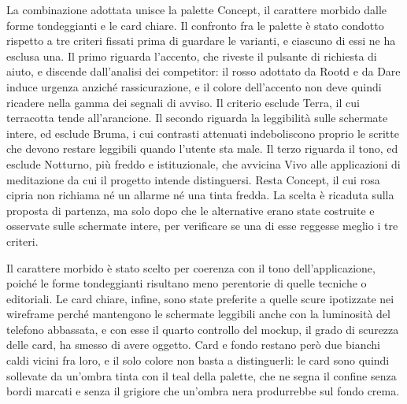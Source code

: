 La combinazione adottata unisce la palette Concept, il carattere morbido dalle forme tondeggianti e le card chiare.
Il confronto fra le palette è stato condotto rispetto a tre criteri fissati prima di guardare le varianti, e ciascuno di essi ne ha esclusa una.
Il primo riguarda l'accento, che riveste il pulsante di richiesta di aiuto, e discende dall'analisi dei competitor: il rosso adottato da Rootd e da Dare induce urgenza anziché rassicurazione, e il colore dell'accento non deve quindi ricadere nella gamma dei segnali di avviso.
Il criterio esclude Terra, il cui terracotta tende all'arancione.
Il secondo riguarda la leggibilità sulle schermate intere, ed esclude Bruma, i cui contrasti attenuati indeboliscono proprio le scritte che devono restare leggibili quando l'utente sta male.
Il terzo riguarda il tono, ed esclude Notturno, più freddo e istituzionale, che avvicina Vivo alle applicazioni di meditazione da cui il progetto intende distinguersi.
Resta Concept, il cui rosa cipria non richiama né un allarme né una tinta fredda.
La scelta è ricaduta sulla proposta di partenza, ma solo dopo che le alternative erano state costruite e osservate sulle schermate intere, per verificare se una di esse reggesse meglio i tre criteri.

Il carattere morbido è stato scelto per coerenza con il tono dell'applicazione, poiché le forme tondeggianti risultano meno perentorie di quelle tecniche o editoriali.
Le card chiare, infine, sono state preferite a quelle scure ipotizzate nei wireframe perché mantengono le schermate leggibili anche con la luminosità del telefono abbassata, e con esse il quarto controllo del mockup, il grado di scurezza delle card, ha smesso di avere oggetto.
Card e fondo restano però due bianchi caldi vicini fra loro, e il solo colore non basta a distinguerli: le card sono quindi sollevate da un'ombra tinta con il teal della palette, che ne segna il confine senza bordi marcati e senza il grigiore che un'ombra nera produrrebbe sul fondo crema.
